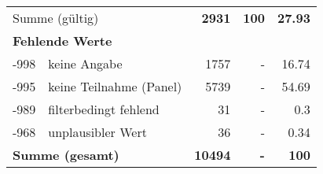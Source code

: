 \begin{longtable}{lXrrr}
     \midrule
     \multicolumn{2}{l}{Summe (gültig)} &
       \textbf{\num{2931}} &
     \textbf{\num{100}} &
       \textbf{\num[round-mode=places,round-precision=2]{27.93}} \\
     \multicolumn{5}{l}{\textbf{Fehlende Werte}}\\
       -998 &
       keine Angabe &
         \num{1757} &
        - &
         \num[round-mode=places,round-precision=2]{16.74} \\
       -995 &
       keine Teilnahme (Panel) &
         \num{5739} &
        - &
         \num[round-mode=places,round-precision=2]{54.69} \\
       -989 &
       filterbedingt fehlend &
         \num{31} &
        - &
         \num[round-mode=places,round-precision=2]{0.3} \\
       -968 &
       unplausibler Wert &
         \num{36} &
        - &
         \num[round-mode=places,round-precision=2]{0.34} \\
     \midrule
     \multicolumn{2}{l}{\textbf{Summe (gesamt)}} &
          \textbf{\num{10494}} &
        \textbf{-} &
        \textbf{\num{100}} \\
     \bottomrule
     \end{longtable}
     
